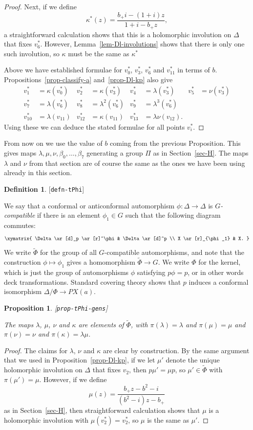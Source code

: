 \documentclass[reqno]{amsart}
\newcommand{\lbl}[1]{\label{#1}\textup{[\texttt{#1}]}\par}
\newcommand{\lbl}{\label}
\newcommand{\Dl}        {\Delta}
\newcommand{\bt}        {\beta}
\newcommand{\kp}        {\kappa}
\newcommand{\lm}        {\lambda}
\newcommand{\tPhi}	{\widetilde{\Phi}}
\renewcommand{\:}{\colon}
\newtheorem{proposition}[theorem]{Proposition}
\theoremstyle{definition}
\newtheorem{definition}[theorem]{Definition}
\begin{document}
\begin{proof}
 Next, if we define
 \[ \kp^*(z) = \frac{b_+i - (1+i)z}{1+i - b_+z}, \]
 a straightforward calculation shows that this is a holomorphic
 involution on $\Dl$ that fixes $v^*_6$.  However,
 Lemma~\ref{lem-Dl-involutions} shows that there is only one such
 involution, so $\kp$ must be the same as $\kp^*$

 Above we have established formulae for $v^*_0$, $v^*_3$, $v^*_6$ and
 $v^*_{11}$ in terms of $b$.  Propositions~\ref{prop-classify-a}
 and~\ref{prop-Dl-kp} also give
 \begin{align*}
  v^*_1 &= \kp(v^*_0) &
  v^*_2 &= \kp(v^*_3) &
  v^*_4 &= \lm(v^*_3) &
  v^*_5 &= \nu(v^*_3) \\
  v^*_7 &= \lm(v^*_6) &
  v^*_8 &= \lm^2(v^*_6) &
  v^*_9 &= \lm^3(v^*_6) \\
  v^*_{10} &= \lm(v_{11}) &
  v^*_{12} &= \kp(v_{11}) &
  v^*_{13} &= \lm\nu(v_{12}).
 \end{align*}
 Using these we can deduce the stated formulae for all points
 $v^*_i$.
\end{proof}

From now on we use the value of $b$ coming from the previous
Proposition.  This gives maps $\lm,\mu,\nu,\bt_0,\dotsc,\bt_7$
generating a group $\Pi$ as in Section~\ref{sec-H}.  The maps
$\lm$ and $\nu$ from that section are of course the same as the ones
we have been using already in this section.

\begin{definition}\lbl{defn-tPhi}
 We say that a conformal or anticonformal automorphism
 $\phi\:\Dl\to\Dl$ is \emph{$G$-compatible} if there is an element
 $\phi_1\in G$ such that the following diagram commutes:
 \[ \xymatrix{
   \Dl \ar[d]_p \ar[r]^\phi & \Dl \ar[d]^p \\
   X \ar[r]_{\phi_1} & X.
 } \]
 We write $\tPhi$ for the group of all $G$-compatible automorphisms,
 and note that the construction $\phi\mapsto\phi_1$ gives a
 homomorphism $\tPhi\to G$.  We write $\Phi$ for the kernel, which is
 just the group of automorphisms $\phi$ satisfying $p\phi=p$, or in
 other words deck transformations.  Standard covering theory shows
 that $p$ induces a conformal isomorphism $\Dl/\Phi\to PX(a)$.
\end{definition}

\begin{proposition}\lbl{prop-tPhi-gens}
 The maps $\lm$, $\mu$, $\nu$ and $\kp$ are elements of $\tPhi$, with
 $\pi(\lm)=\lm$ and $\pi(\mu)=\mu$ and $\pi(\nu)=\nu$ and
 $\pi(\kp)=\lm\mu$.
\end{proposition}
\begin{proof}
 The claims for $\lm$, $\nu$ and $\kp$ are clear by construction.  By
 the same argument that we used in Proposition~\ref{prop-Dl-kp}, if we
 let $\mu'$ denote the unique holomorphic involution on $\Dl$ that
 fixes $v_2$, then $p\mu'=\mu p$, so $\mu'\in\tPhi$ with
 $\pi(\mu')=\mu$.  However, if we define
 \[ \mu(z) = \frac{b_+z-b^2-i}{(b^2-i)z-b_+} \]
 as in Section~\ref{sec-H}, then straightforward calculation
 shows that $\mu$ is a holomorphic involution with $\mu(v^*_2)=v^*_2$,
 so $\mu$ is the same as $\mu'$.
\end{proof}
\end{document}
